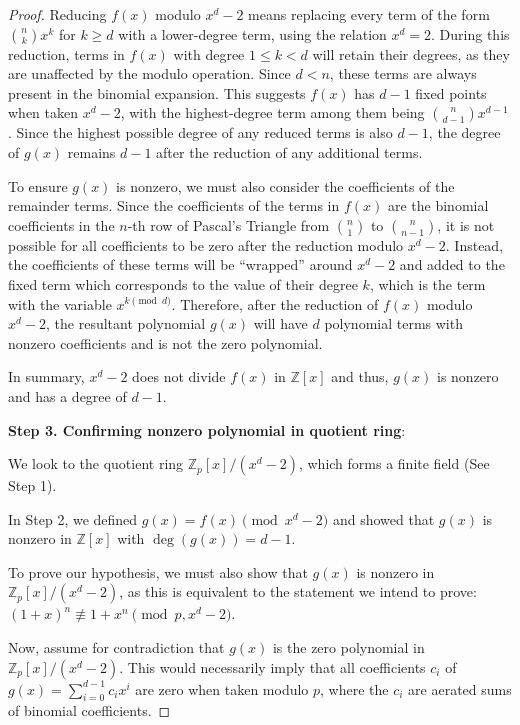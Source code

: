 \documentclass{article}
\theoremstyle{plain}
\theoremstyle{definition}
\begin{document}
\begin{proof}
Reducing $f(x)$ modulo $x^d - 2$ means replacing every term of the form $\binom{n}{k} x^k$ for $k \geq d$ with a lower-degree term, using the relation $x^d = 2$. During this reduction, terms in $f(x)$ with degree $1 \leq k < d$ will retain their degrees, as they are unaffected by the modulo operation. Since $d < n$, these terms are always present in the binomial expansion. This suggests $f(x)$ has $d-1$ fixed points when taken $x^d - 2$,  with the highest-degree term among them being $\binom{n}{d-1} x^{d-1}$. Since the highest possible degree of any reduced terms is also $d-1$, the degree of $g(x)$ remains $d-1$ after the reduction of any additional terms.

To ensure $g(x)$ is nonzero, we must also consider the coefficients of the remainder terms. Since the coefficients of the terms in $f(x)$ are the binomial coefficients in the $n$-th row of Pascal's Triangle from $\binom{n}{1}$ to $\binom{n}{n-1}$, it is not possible for all coefficients to be zero after the reduction modulo $x^d - 2$. Instead, the coefficients of these terms will be ``wrapped'' around $x^d - 2$ and added to the fixed term which corresponds to the value of their degree $k$, which is the term with the variable $x^{k \pmod{d}}$. Therefore, after the reduction of $f(x)$ modulo $x^d - 2$, the resultant polynomial $g(x)$ will have $d$ polynomial terms with nonzero coefficients and is not the zero polynomial.

In summary, $x^d-2$ does not divide $f(x)$ in $\mathbb{Z}[x]$ and thus, $g(x)$ is nonzero and has a degree of $d-1$.

\textbf{Step 3. Confirming nonzero polynomial in quotient ring}:

We look to the quotient ring $\mathbb{Z}_p[x]/(x^d - 2)$, which forms a finite field (See Step 1).

In Step 2, we defined $g(x) = f(x) \pmod{x^d-2}$ and showed that $g(x)$ is nonzero in $\mathbb{Z}[x]$ with $\deg(g(x)) = d-1$.

To prove our hypothesis, we must also show that $g(x)$ is nonzero in $\mathbb{Z}_p[x]/(x^d - 2)$, as this is equivalent to the statement we intend to prove: $(1 + x)^n \not\equiv 1 + x^n \pmod{p, x^d-2}$.

Now, assume for contradiction that $g(x)$ is the zero polynomial in $\mathbb{Z}_p[x]/(x^d - 2)$. This would necessarily imply that all coefficients $c_i$ of $g(x) = \sum_{i=0}^{d-1} c_i x^i$ are zero when taken modulo $p$, where the $c_i$ are aerated sums of binomial coefficients.


\end{proof}
\end{document}
